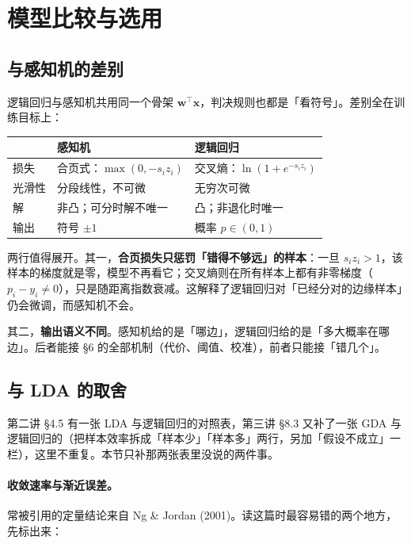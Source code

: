 \documentclass[11pt,a4paper,fontset=windows,zihao=-4]{ctexart}
\newcommand{\bw}{\mathbf{w}}
\newcommand{\bx}{\mathbf{x}}
\newcommand{\tp}{^{\top}}
\newcommand{\tabhead}{\sffamily\bfseries\color{navy}}
\begin{document}
\section{模型比较与选用}

\subsection{与感知机的差别}

逻辑回归与感知机共用同一个骨架 $\bw\tp\bx$，判决规则也都是「看符号」。差别全在训练目标上：

\begin{center}
\small
\begin{tabular}{@{}lp{5.4cm}p{5.4cm}@{}}
\toprule
\rowcolor{navy!7}
\tabhead & \tabhead 感知机 & \tabhead 逻辑回归\\
\midrule
损失 & 合页式：$\max(0,-s_i z_i)$ & 交叉熵：$\ln(1+e^{-s_iz_i})$\\
光滑性 & 分段线性，不可微 & 无穷次可微\\
解 & 非凸；可分时解不唯一 & 凸；非退化时唯一\\
输出 & 符号 $\pm1$ & 概率 $p\in(0,1)$\\
\bottomrule
\end{tabular}
\end{center}

两行值得展开。其一，\textbf{合页损失只惩罚「错得不够远」的样本}：一旦 $s_iz_i>1$，该样本的梯度就是零，模型不再看它；交叉熵则在所有样本上都有非零梯度（$p_i-y_i\ne0$），只是随距离指数衰减。这解释了逻辑回归对「已经分对的边缘样本」仍会微调，而感知机不会。

其二，\textbf{输出语义不同}。感知机给的是「哪边」，逻辑回归给的是「多大概率在哪边」。后者能接 \S6 的全部机制（代价、阈值、校准），前者只能接「错几个」。

\subsection{与 LDA 的取舍}

第二讲 \S4.5 有一张 LDA 与逻辑回归的对照表，第三讲 \S8.3 又补了一张 GDA 与逻辑回归的（把样本效率拆成「样本少」「样本多」两行，另加「假设不成立」一栏），这里不重复。本节只补那两张表里没说的两件事。

\paragraph{收敛速率与渐近误差。}常被引用的定量结论来自 Ng \& Jordan (2001)。读这篇时最容易错的两个地方，先标出来：
\end{document}
